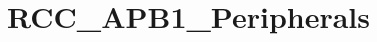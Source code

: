 \hypertarget{group___r_c_c___a_p_b1___peripherals}{\section{R\-C\-C\-\_\-\-A\-P\-B1\-\_\-\-Peripherals}
\label{group___r_c_c___a_p_b1___peripherals}
}
